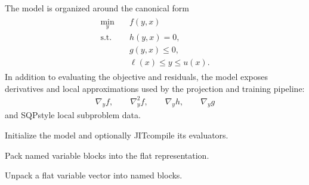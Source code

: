 \documentclass[letterpaper,10pt,english,openany,oneside]{sphinxmanual}
\begin{document}
\begin{fulllineitems}
\sphinxAtStartPar
The model is organized around the canonical form
\begin{equation*}
\begin{split}\begin{aligned}
    \min_y \quad & f(y, x) \\
    \text{s.t.}\quad & h(y, x) = 0, \\
    & g(y, x) \le 0, \\
    & \ell(x) \le y \le u(x).
\end{aligned}\end{split}
\end{equation*}
\sphinxAtStartPar
In addition to evaluating the objective and residuals, the model exposes
derivatives and local approximations used by the projection and training
pipeline:
\begin{equation*}
\begin{split}\nabla_y f,\qquad \nabla_y^2 f,\qquad
\nabla_y h,\qquad \nabla_y g\end{split}
\end{equation*}
\sphinxAtStartPar
and SQP\sphinxhyphen{}style local subproblem data.

\sphinxAtStartPar
Initialize the model and optionally JIT\sphinxhyphen{}compile its evaluators.

\begin{fulllineitems}
\label{\detokenize{api/core/jaxmodel/model:jaxmodel.model.JaxNLPModel.pack_vars}}
\pysigstartsignatures
{}
\pysigstopsignatures
\sphinxAtStartPar
Pack named variable blocks into the flat representation.

\end{fulllineitems}


\begin{fulllineitems}
\label{\detokenize{api/core/jaxmodel/model:jaxmodel.model.JaxNLPModel.unpack_vars}}
\pysigstartsignatures
{}
\pysigstopsignatures
\sphinxAtStartPar
Unpack a flat variable vector into named blocks.

\end{fulllineitems}


\end{fulllineitems}
\end{document}
